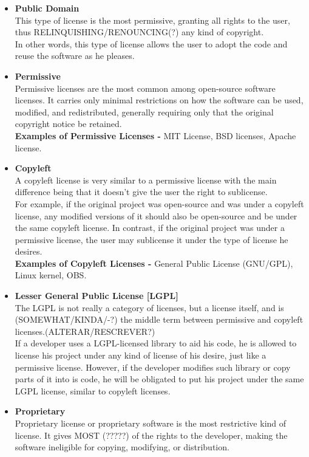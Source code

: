 \begin{itemize}

  \item \textbf{Public Domain}  \\
  This type of license is the most permissive, granting all rights to the user, thus RELINQUISHING/RENOUNCING(?) any kind of copyright. \\
  In other words, this type of license allows the user to adopt the code and reuse the software as he pleases.
 
  
  \item \textbf{Permissive} \\
  Permissive licenses are the most common among open-source software licenses. It carries only minimal restrictions on how the software can be used, modified, and redistributed, generally requiring only that the original copyright notice be retained.\\
  \textbf{Examples of Permissive Licenses -} MIT License, BSD licenses, Apache license.
  
  \item \textbf{Copyleft} \\
  A copyleft license is very similar to a permissive license with the main difference being that it doesn't give the user the right to sublicense. \\
  For example, if the original project was open-source and was under a copyleft license, any modified versions of it should also be open-source and be under the same copyleft license. In contrast, if the original project was under a permissive license, the user may sublicense it under the type of license he desires.\\
  \textbf{Examples of Copyleft Licenses -} General Public License (GNU/GPL), Linux kernel, OBS.
  
    
  \item \textbf{Lesser General Public License [LGPL]} \\
  The LGPL is not really a category of licenses, but a license itself, and is (SOMEWHAT/KINDA/-?) the middle term between permissive and copyleft licenses.(ALTERAR/RESCREVER?) \\
  If a developer uses a LGPL-licensed library to aid his code, he is allowed to license his project under any kind of license of his desire, just like a permissive license. However, if the developer modifies such library or copy parts of it into is code, he will be obligated to put his project under the same LGPL license, similar to copyleft licenses.
  
  
  \item \textbf{Proprietary}\\
  Proprietary license or proprietary software is the most restrictive kind of license. It gives MOST (?????) of the rights to the developer, making the software ineligible for copying, modifying, or distribution.

\end{itemize}


